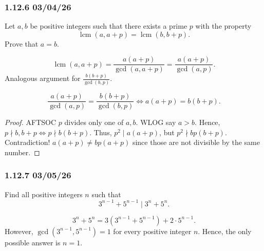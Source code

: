 \clearpage

\subsubsection{1.12.6 03/04/26}
\begin{problem}
Let $a,b$ be positive integers such that there exists a prime $p$ with the property
\[
	\operatorname{lcm}(a,a+p)=\operatorname{lcm}(b,b+p).
\]
Prove that $a=b$.
\end{problem}
\[
	\operatorname{lcm}(a,a+p)=\frac{a(a+p)}{\operatorname{gcd}(a,a+p)}=\frac{a(a+p)}{\operatorname{gcd}(a,p)}.
\]
Analogous argument for $\frac{b(b+p)}{\operatorname{gcd}(b,p)}$.
\begin{claim}
	\[
		\frac{a(a+p)}{\operatorname{gcd}(a,p)} = \frac{b(b+p)}{\operatorname{gcd}(b,p)} \iff a(a+p)=b(b+p).
	\]
\end{claim}
\begin{proof}
	AFTSOC $p$ divides only one of $a,b$. WLOG say $a>b$. Hence, $p \nmid b,b+p \iff p \nmid b(b+p)$. Thus,
	$p^2 \mid a(a+p)$, but $p^2 \nmid bp(b+p)$. Contradiction! $a(a+p)\neq bp(a+p)$ since those are not divisible
	by the same number. \qedhere
\end{proof}

\clearpage

\subsubsection{1.12.7 03/05/26}
\begin{problem}
Find all positive integers $n$ such that
\[
	3^{n-1}+5^{n-1}\mid 3^n+5^n.
\]
\end{problem}
\[
	3^n+5^n=3(3^{n-1}+5^{n-1})+ 2\cdot 5^{n-1}.
\]
However, $\operatorname{gcd}(3^{n-1},5^{n-1})=1$ for every positive integer $n$. Hence, the only possible
answer is $n=1$.
